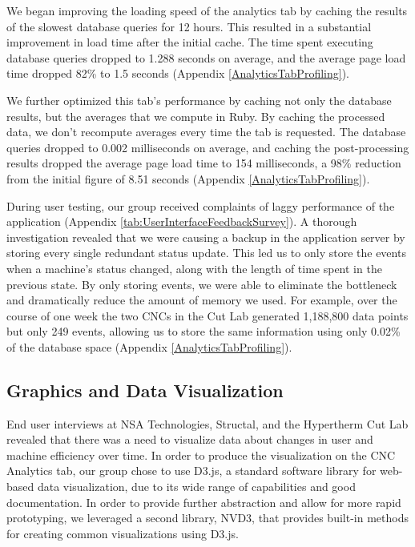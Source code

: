 \documentclass[12pt,letterpaper,titlepage]{article}
\begin{document}
We began improving the loading speed of the analytics tab by caching the results of the slowest database queries for 12 hours. This resulted in a substantial improvement in load time after the initial cache. The time spent executing database queries dropped to 1.288 seconds on average, and the average page load time dropped 82\% to 1.5 seconds (Appendix \ref{AnalyticsTabProfiling}).

We further optimized this tab's performance by caching not only the database results, but the averages that we compute in Ruby. By caching the processed data, we don't recompute averages every time the tab is requested. The database queries dropped to 0.002 milliseconds on average, and caching the post-processing results dropped the average page load time to 154 milliseconds, a 98\% reduction from the initial figure of 8.51 seconds (Appendix \ref{AnalyticsTabProfiling}). 

During user testing, our group received complaints of laggy performance of the application (Appendix \ref{tab:UserInterfaceFeedbackSurvey}). A thorough investigation revealed that we were causing a backup in the application server by storing every single redundant status update. This led us to only store the events when a machine's status changed, along with the length of time spent in the previous state. By only storing events, we were able to eliminate the bottleneck and dramatically reduce the amount of memory we used. For example, over the course of one week the two CNCs in the Cut Lab generated 1,188,800 data points but only 249 events, allowing us to store the same information using only 0.02\% of the database space (Appendix \ref{AnalyticsTabProfiling}).

\subsection{Graphics and Data Visualization} \label{sec:GraphicsandDataVisualization}

End user interviews at NSA Technologies, Structal, and the Hypertherm Cut Lab revealed that there was a need to visualize data about changes in user and machine efficiency over time. In order to produce the visualization on the CNC Analytics tab, our group chose to use D3.js, a standard software library for web-based data visualization, due to its wide range of capabilities and good documentation. In order to provide further abstraction and allow for more rapid prototyping, we leveraged a second library, NVD3, that provides built-in methods for creating common visualizations using D3.js.
\end{document}
